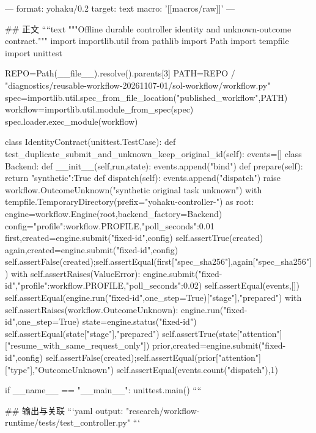 ---
format: yohaku/0.2
target: text
macro: '[[macros/raw]]'
---

## 正文
````text
"""Offline durable controller identity and unknown-outcome contract."""
import importlib.util
from pathlib import Path
import tempfile
import unittest

REPO=Path(__file__).resolve().parents[3]
PATH=REPO / "diagnostics/reusable-workflow-20261107-01/sol-workflow/workflow.py"
spec=importlib.util.spec_from_file_location("published_workflow",PATH)
workflow=importlib.util.module_from_spec(spec)
spec.loader.exec_module(workflow)

class IdentityContract(unittest.TestCase):
    def test_duplicate_submit_and_unknown_keep_original_id(self):
        events=[]
        class Backend:
            def __init__(self,run,state): events.append("bind")
            def prepare(self): return {"synthetic":True}
            def dispatch(self):
                events.append("dispatch")
                raise workflow.OutcomeUnknown("synthetic original task unknown")
        with tempfile.TemporaryDirectory(prefix="yohaku-controller-") as root:
            engine=workflow.Engine(root,backend_factory=Backend)
            config={"profile":workflow.PROFILE,"poll_seconds":0.01}
            first,created=engine.submit("fixed-id",config)
            self.assertTrue(created)
            again,created=engine.submit("fixed-id",config)
            self.assertFalse(created);self.assertEqual(first["spec_sha256"],again["spec_sha256"])
            with self.assertRaises(ValueError): engine.submit("fixed-id",{"profile":workflow.PROFILE,"poll_seconds":0.02})
            self.assertEqual(events,[])
            self.assertEqual(engine.run("fixed-id",one_step=True)["stage"],"prepared")
            with self.assertRaises(workflow.OutcomeUnknown): engine.run("fixed-id",one_step=True)
            state=engine.status("fixed-id")
            self.assertEqual(state["stage"],"prepared")
            self.assertTrue(state["attention"]["resume_with_same_request_only"])
            prior,created=engine.submit("fixed-id",config)
            self.assertFalse(created);self.assertEqual(prior["attention"]["type"],"OutcomeUnknown")
            self.assertEqual(events.count("dispatch"),1)

if __name__ == "__main__": unittest.main()
````

## 输出与关联
```yaml
output: "research/workflow-runtime/tests/test_controller.py"
```
